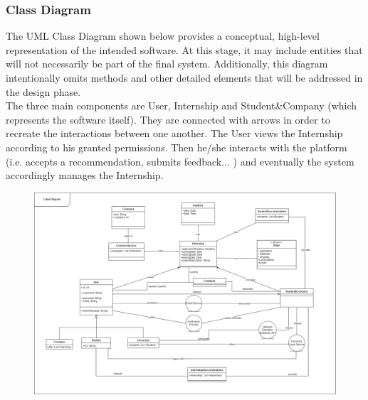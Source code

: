 \documentclass[a4paper,12pt]{article}
\begin{document}
\subsubsection{Class Diagram}
The UML Class Diagram shown below provides a conceptual, high-level representation of the intended software. At this stage, it may include entities that will not necessarily be part of the final system. Additionally, this diagram intentionally omits methods and other detailed elements that will be addressed in the design phase.
\\The three main components are User, Internship and Student\&Company (which represents the software itself). They are connected with arrows in order to recreate the interactions between one another. The User views the Internship according to his granted permissions. Then he/she interacts with the platform (i.e. accepts a recommendation, submits feedback... ) and eventually the system accordingly manages the Internship.
\begin{figure}[H]
    \centering
    \includegraphics[scale = 0.30]{figures/Class Diagram.drawio.png}
    \centering
\end{figure}
\end{document}
